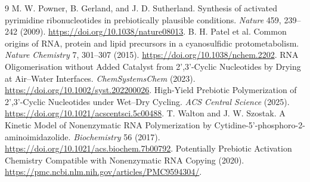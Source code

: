 \documentclass[11pt]{article}
\begin{document}
\begin{thebibliography}{9}
 M. W. Powner, B. Gerland, and J. D. Sutherland.
Synthesis of activated pyrimidine ribonucleotides in prebiotically plausible
conditions. \emph{Nature} 459, 239--242 (2009).
\url{https://doi.org/10.1038/nature08013}.
 B. H. Patel et al. Common origins of RNA, protein and lipid
precursors in a cyanosulfidic protometabolism. \emph{Nature Chemistry} 7,
301--307 (2015). \url{https://doi.org/10.1038/nchem.2202}.
 RNA Oligomerisation without Added Catalyst from 2',3'-Cyclic
Nucleotides by Drying at Air--Water Interfaces. \emph{ChemSystemsChem} (2023).
\url{https://doi.org/10.1002/syst.202200026}.
 High-Yield Prebiotic Polymerization of 2',3'-Cyclic Nucleotides
under Wet--Dry Cycling. \emph{ACS Central Science} (2025).
\url{https://doi.org/10.1021/acscentsci.5c00488}.
 T. Walton and J. W. Szostak. A Kinetic Model of Nonenzymatic
RNA Polymerization by Cytidine-5'-phosphoro-2-aminoimidazolide.
\emph{Biochemistry} 56 (2017).
\url{https://doi.org/10.1021/acs.biochem.7b00792}.
 Potentially Prebiotic Activation Chemistry Compatible
with Nonenzymatic RNA Copying (2020).
\url{https://pmc.ncbi.nlm.nih.gov/articles/PMC9594304/}.
\end{thebibliography}
\end{document}
